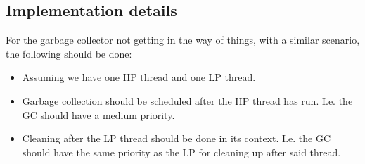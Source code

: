 \documentclass[a4paper]{article}
\begin{document}
\subsection{Implementation details}
For the garbage collector not getting in the way of things, with a similar
scenario, the following should be done:

\begin{itemize}
  \item Assuming we have one HP thread and one LP thread.
  \item Garbage collection should be scheduled after the HP thread has run.
        I.e. the GC should have a medium priority.
  \item Cleaning after the LP thread should be done in its context. I.e. the
        GC should have the same priority as the LP for cleaning up after said
        thread.
\end{itemize}
\end{document}
